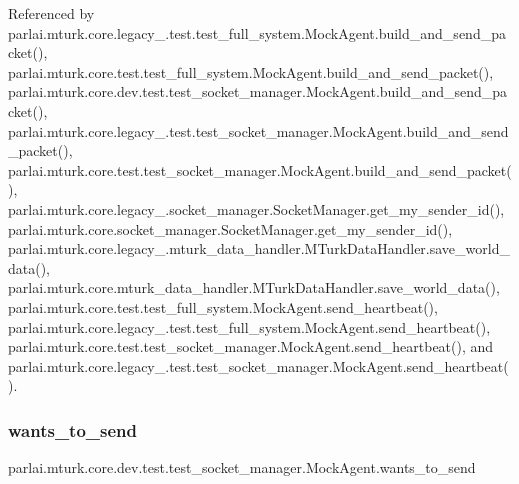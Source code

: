 Referenced by parlai.\+mturk.\+core.\+legacy\+\_.\+test.\+test\+\_\+full\+\_\+system.\+Mock\+Agent.\+build\+\_\+and\+\_\+send\+\_\+packet(), parlai.\+mturk.\+core.\+test.\+test\+\_\+full\+\_\+system.\+Mock\+Agent.\+build\+\_\+and\+\_\+send\+\_\+packet(), parlai.\+mturk.\+core.\+dev.\+test.\+test\+\_\+socket\+\_\+manager.\+Mock\+Agent.\+build\+\_\+and\+\_\+send\+\_\+packet(), parlai.\+mturk.\+core.\+legacy\+\_.\+test.\+test\+\_\+socket\+\_\+manager.\+Mock\+Agent.\+build\+\_\+and\+\_\+send\+\_\+packet(), parlai.\+mturk.\+core.\+test.\+test\+\_\+socket\+\_\+manager.\+Mock\+Agent.\+build\+\_\+and\+\_\+send\+\_\+packet(), parlai.\+mturk.\+core.\+legacy\+\_.\+socket\+\_\+manager.\+Socket\+Manager.\+get\+\_\+my\+\_\+sender\+\_\+id(), parlai.\+mturk.\+core.\+socket\+\_\+manager.\+Socket\+Manager.\+get\+\_\+my\+\_\+sender\+\_\+id(), parlai.\+mturk.\+core.\+legacy\+\_.\+mturk\+\_\+data\+\_\+handler.\+M\+Turk\+Data\+Handler.\+save\+\_\+world\+\_\+data(), parlai.\+mturk.\+core.\+mturk\+\_\+data\+\_\+handler.\+M\+Turk\+Data\+Handler.\+save\+\_\+world\+\_\+data(), parlai.\+mturk.\+core.\+test.\+test\+\_\+full\+\_\+system.\+Mock\+Agent.\+send\+\_\+heartbeat(), parlai.\+mturk.\+core.\+legacy\+\_.\+test.\+test\+\_\+full\+\_\+system.\+Mock\+Agent.\+send\+\_\+heartbeat(), parlai.\+mturk.\+core.\+test.\+test\+\_\+socket\+\_\+manager.\+Mock\+Agent.\+send\+\_\+heartbeat(), and parlai.\+mturk.\+core.\+legacy\+\_.\+test.\+test\+\_\+socket\+\_\+manager.\+Mock\+Agent.\+send\+\_\+heartbeat().

\mbox{\label{classparlai_1_1mturk_1_1core_1_1dev_1_1test_1_1test__socket__manager_1_1MockAgent_a9b5d912718218efb899c9de68e82b4d2}} 
\subsubsection{\texorpdfstring{wants\+\_\+to\+\_\+send}{wants\_to\_send}}
{\footnotesize\ttfamily parlai.\+mturk.\+core.\+dev.\+test.\+test\+\_\+socket\+\_\+manager.\+Mock\+Agent.\+wants\+\_\+to\+\_\+send}



